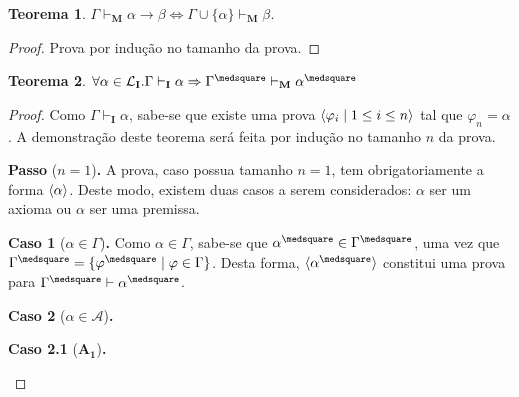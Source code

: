 \documentclass{report}
\newtheorem{theorem}{Teorema}
\begin{document}
    \begin{theorem}
        $\Gamma\vdash_\mathbf{M}\alpha\to\beta\Leftrightarrow\Gamma\cup\{\alpha\}\vdash_\mathbf{M}\beta$.
    \end{theorem}

    \begin{proof}
        Prova por indução no tamanho da prova.
    \end{proof}

    \begin{theorem}
        $\forall \alpha \in \mathcal{L}_\mathbf{I} . \Gamma \vdash_\mathbf{I} \alpha \Rightarrow \Gamma^\medsquare \vdash_\mathbf{M} \alpha^\medsquare$
    \end{theorem}

    \begin{proof}
        Como $\Gamma \vdash_\mathbf{I} \alpha$, sabe-se que existe uma prova $\langle\varphi_i\mid 1 \leq i \leq n\rangle$ tal que $\varphi_n = \alpha$. A demonstração deste teorema será feita por indução no tamanho $n$ da prova.

        \begin{case}
                \textbf{Passo} ($n = 1$)\textbf{.} A prova, caso possua tamanho $n = 1$, tem obrigatoriamente a forma $\langle\alpha\rangle$. Deste modo, existem duas casos a serem considerados: $\alpha$ ser um axioma ou $\alpha$ ser uma premissa.
                
                \begin{case}
                    \textbf{Caso 1} ($\alpha\in\Gamma$)\textbf{.} Como $\alpha\in\Gamma$, sabe-se que $\alpha^\medsquare\in\Gamma^\medsquare$, uma vez que $\Gamma^\medsquare = \set{\varphi^\medsquare\mid\varphi\in\Gamma}$. Desta forma, $\sequence{\alpha^\medsquare}$ constitui uma prova para $\Gamma^\medsquare\vdash\alpha^\medsquare$.
                \end{case}

                \begin{case}
                    \textbf{Caso 2} ($\alpha\in\mathcal{A}$)\textbf{.}

                    \begin{case}
                        \textbf{Caso 2.1} ($\mathbf{A_1}$)\textbf{.}


\end{case}
\end{case}
\end{case}
\end{proof}
\end{document}
